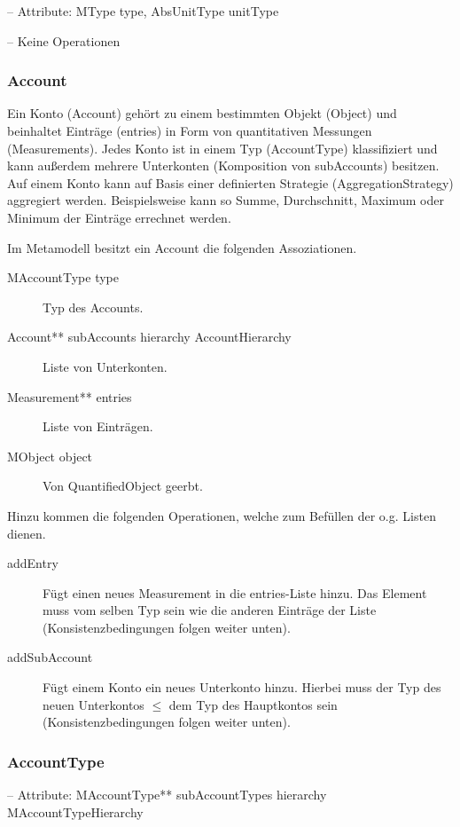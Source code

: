 
-- Attribute: MType type, AbsUnitType unitType

-- Keine Operationen


\subsubsection{Account}
Ein Konto (Account) gehört zu einem bestimmten Objekt (Object) und beinhaltet Einträge (entries) in Form von quantitativen Messungen (Measurements). 
Jedes Konto ist in einem Typ (AccountType) klassifiziert und kann außerdem mehrere Unterkonten (Komposition von subAccounts) besitzen.
Auf einem Konto kann auf Basis einer definierten Strategie (AggregationStrategy) aggregiert werden. 
Beispielsweise kann so Summe, Durchschnitt, Maximum oder Minimum der Einträge errechnet werden. 

Im Metamodell besitzt ein Account die folgenden Assoziationen.
\begin{description}
	\item[MAccountType type] Typ des Accounts.
	\item[Account** subAccounts hierarchy AccountHierarchy] Liste von Unterkonten.
	\item[Measurement** entries] Liste von Einträgen.
	\item[MObject object] Von QuantifiedObject geerbt.
\end{description}

Hinzu kommen die folgenden Operationen, welche zum Befüllen der o.g. Listen dienen.
\begin{description}
	\item[addEntry] Fügt einen neues Measurement in die entries-Liste hinzu. Das Element muss vom selben Typ sein wie die anderen Einträge der Liste (Konsistenzbedingungen folgen weiter unten).  
	\item[addSubAccount] Fügt einem Konto ein neues Unterkonto hinzu. Hierbei muss der Typ des neuen Unterkontos $\leq$ dem Typ des Hauptkontos sein (Konsistenzbedingungen folgen weiter unten).
\end{description}


\subsubsection{AccountType}


-- Attribute: MAccountType** subAccountTypes hierarchy MAccountTypeHierarchy

